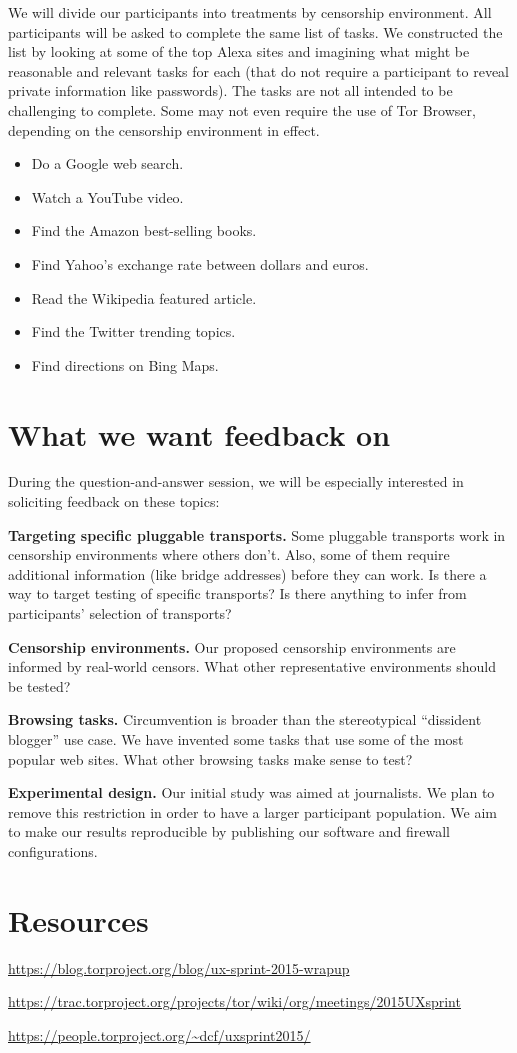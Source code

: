 \documentclass{sig-alternate-hotpets15}
\begin{document}
We will divide our participants into treatments
by censorship environment.
All participants will be asked to complete the same
list of tasks.
We constructed the list by looking at some of the top
Alexa sites and imagining what might be reasonable
and relevant tasks for each
(that do not require a participant to reveal private information
like passwords).
The tasks are not all intended to be challenging to complete.
Some may not even require the use of Tor Browser,
depending on the censorship environment in effect.

\begin{itemize} \itemsep1pt \parskip0pt 
\item Do a Google web search.
\item Watch a YouTube video.
\item Find the Amazon best-selling books.
\item Find Yahoo's exchange rate between dollars and euros.
\item Read the Wikipedia featured article.
\item Find the Twitter trending topics.
\item Find directions on Bing Maps.
\end{itemize}

\section{What we want feedback on}

During the question-and-answer session,
we will be especially interested in soliciting feedback
on these topics:

{\bfseries Targeting specific pluggable transports.}
Some pluggable transports work in censorship environments
where others don't.
Also, some of them require additional information
(like bridge addresses) before they can work.
Is there a way to target testing of specific transports?
Is there anything to infer from participants' selection of transports?

{\bfseries Censorship environments.}
Our proposed censorship environments are informed
by real-world censors.
What other representative environments
should be tested?

{\bfseries Browsing tasks.}
Circumvention is broader than the stereotypical
``dissident blogger'' use case.
We have invented some tasks that use some of the
most popular web sites.
What other browsing tasks make sense to test?

{\bfseries Experimental design.}
Our initial study was aimed at journalists.
We plan to remove this restriction in order
to have a larger participant population.
We aim to make our results reproducible by publishing
our software and firewall configurations.

\section{Resources}

\url{https://blog.torproject.org/blog/ux-sprint-2015-wrapup}

\url{https://trac.torproject.org/projects/tor/wiki/org/meetings/2015UXsprint}

\url{https://people.torproject.org/~dcf/uxsprint2015/}


 
\end{document}
